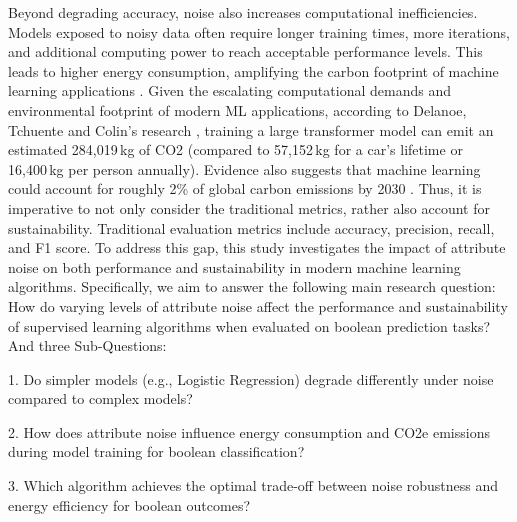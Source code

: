 \documentclass[conference]{IEEEtran}
\begin{document}
\newline
\newline
Beyond degrading accuracy, noise also increases computational inefficiencies. Models exposed to noisy data often require longer training times, more iterations, and additional computing power to reach acceptable performance levels. This leads to higher energy consumption, amplifying the carbon footprint of machine learning applications \cite{sciencedirect}.
\newline
\newline
Given the escalating computational demands and environmental footprint of modern ML applications, according to Delanoe, Tchuente and Colin’s research \cite{DELAN}, training a large transformer model can emit an estimated 284,019 kg of CO2 (compared to 57,152 kg for a car’s lifetime or 16,400 kg per person annually). Evidence also suggests that machine learning could account for roughly 2\% of global carbon emissions by 2030 \cite{carbon_emissions}.
Thus, it is imperative to not only consider the traditional metrics, rather also account for sustainability. Traditional evaluation metrics include accuracy, precision, recall, and F1 score.
\newline 
\newline
To address this gap, this study investigates the impact of attribute noise on both performance and sustainability in modern machine learning algorithms. Specifically, we aim to answer the following main research question:
How do varying levels of attribute noise affect the performance and sustainability of supervised learning algorithms when evaluated on boolean prediction tasks?
\newline
\newline
And three Sub-Questions:
\begin{itemize}
     1. Do simpler models (e.g., Logistic Regression) degrade differently under noise compared to complex models?
     \newline

     2. How does attribute noise influence energy consumption and CO2e emissions during model training for boolean classification?
     \newline

     3. Which algorithm achieves the optimal trade-off between noise robustness and energy efficiency for boolean outcomes?
\end{itemize}
\newline 
\newline
\end{document}
